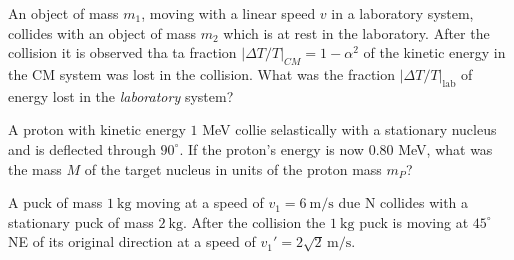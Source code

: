 \documentclass[../feynman-lectures-on-physics.tex]{subfiles}
\begin{document}
\begin{questions}
\question An object of mass $m_1$, moving with a linear speed $v$ in a
  laboratory system, collides with an object of mass $m_2$ which is at rest
  in the laboratory. After the collision it is observed tha ta fraction
  $|\Delta{T}/T|_{CM} = 1 - \alpha^2$ of the kinetic energy in the CM system
  was lost in the collision. What was the fraction
  $|\Delta{T}/T|_{\text{lab}}$ of energy lost in the \textit{laboratory}
  system?

\question

\question A proton with kinetic energy $1$ MeV collie selastically with a
  stationary nucleus and is deflected through $90^\circ$. If the proton's
  energy is now $0.80$ MeV, what was the mass $M$ of the target nucleus in
  units of the proton mass $m_P$?

\question A puck of mass $\SI{1}{\kilo\gram}$ moving at a speed of
  $v_1=\SI{6}{\meter\per\second}$ due N collides with a stationary puck
  of mass $\SI{2}{\kilo\gram}$. After the collision the
  $\SI{1}{\kilo\gram}$ puck is moving at $45^\circ$ NE of its original
  direction at a speed of $v_1'=2\sqrt{2}\,\si{\meter\per\second}$.


\end{questions}
\end{document}
